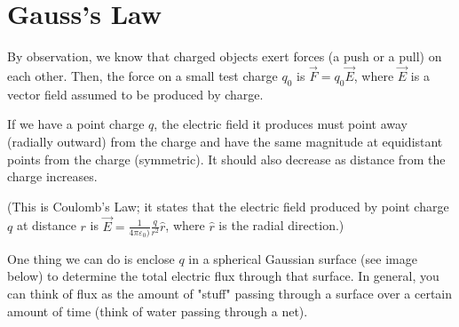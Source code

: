 \documentclass{article}
\begin{document}
\pagebreak
\section{Gauss's Law}

By observation, we know that charged objects exert forces (a push or a pull) on each other. Then, the force on a small test charge $q_0$ is $\vec F = q_0 \vec E$, where $\vec E$ is a vector field assumed to be produced by charge. 

\vspace{1em}

If we have a point charge $q$, the electric field it produces must point away (radially outward) from the charge and have the same magnitude at equidistant points from the charge (symmetric). It should also decrease as distance from the charge increases.

(This is Coulomb's Law; it states that the electric field produced by point charge $q$ at distance $r$ is $\vec E = \frac{1}{4\pi\varepsilon_0)} \frac{q}{r^2} \hat{r}$, where $\hat{r}$ is the radial direction.)

\vspace{1em}

One thing we can do is enclose $q$ in a spherical Gaussian surface (see image below) to determine the total electric flux through that surface. In general, you can think of flux as the amount of "stuff" passing through a surface over a certain amount of time (think of water passing through a net). 

\vspace{5em}

\end{document}
